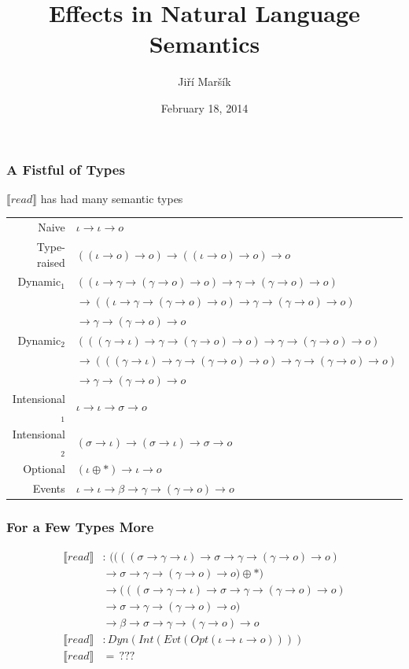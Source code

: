 \documentclass{beamer}
\newcommand{\hastype}{\mathop{:}}
\newcommand{\sem}[1]{\llbracket #1 \rrbracket}
\begin{document}
\title[Effects \& Semantics]{Effects in Natural Language Semantics}
\author{Jiří Maršík}
\date[February 2014]{February 18, 2014}

\frame{\titlepage \setcounter{framenumber}{1}}

\begin{frame}
  \frametitle{A Fistful of Types}

  $\sem{read}$ has had many semantic types

  \vfill

  \begin{tabular}{rl}
    Naive & $\iota \to \iota \to o$ \\
    Type-raised & $((\iota \to o) \to o) \to ((\iota \to o) \to o) \to o$ \\
    Dynamic$_1$ & $((\iota \to \gamma \to (\gamma \to o) \to o) \to \gamma \to (\gamma \to o) \to o)$ \\ & $\to ((\iota \to \gamma \to (\gamma \to o) \to o) \to \gamma \to (\gamma \to o) \to o)$ \\ & $\to \gamma \to (\gamma \to o) \to o$ \\
    Dynamic$_2$ & $(((\gamma \to \iota) \to \gamma \to (\gamma \to o) \to o) \to \gamma \to (\gamma \to o) \to o)$ \\ & $\to (((\gamma \to \iota) \to \gamma \to (\gamma \to o) \to o) \to \gamma \to (\gamma \to o) \to o)$ \\ & $\to \gamma \to (\gamma \to o) \to o$ \\
    Intensional$_1$ & $\iota \to \iota \to \sigma \to o$ \\
    Intensional$_2$ & $(\sigma \to \iota) \to (\sigma \to \iota) \to \sigma \to o$ \\
    Optional & $(\iota \oplus *) \to \iota \to o$ \\
    Events & $\iota \to \iota \to \beta \to \gamma \to (\gamma \to o) \to o$
  \end{tabular}
\end{frame}

\begin{frame}
  \frametitle{For a Few Types More}
  
  \begin{align*}
    \sem{read} & \hastype \, ((((\sigma \to \gamma \to \iota) \to \sigma \to \gamma \to (\gamma \to o) \to o) \\
    & \to \sigma \to \gamma \to (\gamma \to o) \to o) \oplus *) \\
    & \to (((\sigma \to \gamma \to \iota) \to \sigma \to \gamma \to (\gamma \to o) \to o) \\
    & \to \sigma \to \gamma \to (\gamma \to o) \to o) \\
    & \to \beta \to \sigma \to \gamma \to (\gamma \to o) \to o \\
    \sem{read} & \hastype Dyn(Int(Evt(Opt(\iota \to \iota \to o)))) \\
    \sem{read} & =\, ??? \\
  \end{align*}
\end{frame}
\end{document}
